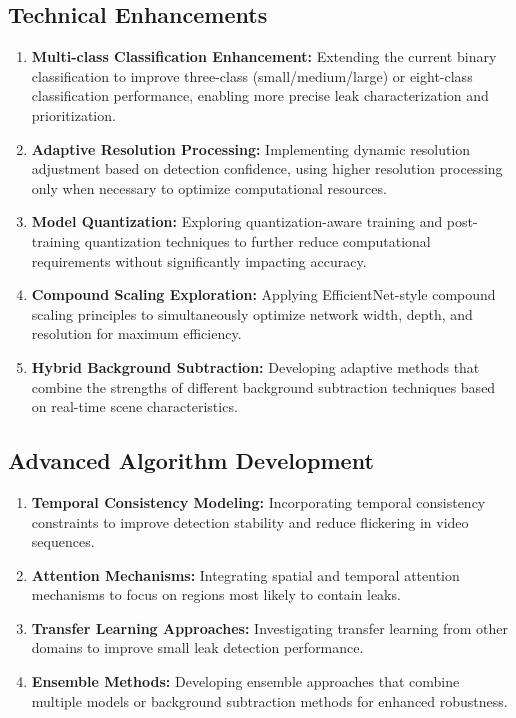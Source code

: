 \subsection{Technical Enhancements}

\begin{enumerate}
\item \textbf{Multi-class Classification Enhancement:} Extending the current binary classification to improve three-class (small/medium/large) or eight-class classification performance, enabling more precise leak characterization and prioritization.

\item \textbf{Adaptive Resolution Processing:} Implementing dynamic resolution adjustment based on detection confidence, using higher resolution processing only when necessary to optimize computational resources.

\item \textbf{Model Quantization:} Exploring quantization-aware training and post-training quantization techniques to further reduce computational requirements without significantly impacting accuracy.

\item \textbf{Compound Scaling Exploration:} Applying EfficientNet-style compound scaling principles to simultaneously optimize network width, depth, and resolution for maximum efficiency.

\item \textbf{Hybrid Background Subtraction:} Developing adaptive methods that combine the strengths of different background subtraction techniques based on real-time scene characteristics.
\end{enumerate}

\subsection{Advanced Algorithm Development}

\begin{enumerate}
\item \textbf{Temporal Consistency Modeling:} Incorporating temporal consistency constraints to improve detection stability and reduce flickering in video sequences.

\item \textbf{Attention Mechanisms:} Integrating spatial and temporal attention mechanisms to focus on regions most likely to contain leaks.

\item \textbf{Transfer Learning Approaches:} Investigating transfer learning from other domains to improve small leak detection performance.

\item \textbf{Ensemble Methods:} Developing ensemble approaches that combine multiple models or background subtraction methods for enhanced robustness.
\end{enumerate}

